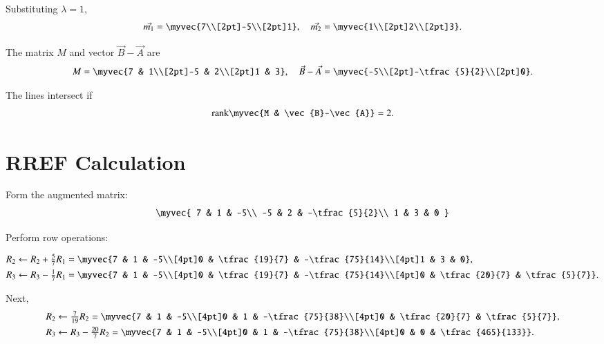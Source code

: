 \documentclass[journal]{IEEEtran}
\begin{document}
Substituting $\lambda=1$,
\begin{align}
\vec{m_1} = \myvec{7\\[2pt]-5\\[2pt]1}, \quad 
\vec{m_2} = \myvec{1\\[2pt]2\\[2pt]3}. \label{eq:m1m2}
\end{align}

The matrix $M$ and vector $\vec{B}-\vec{A}$ are
\begin{align}
M = \myvec{7 & 1\\[2pt]-5 & 2\\[2pt]1 & 3}, \quad 
\vec{B}-\vec{A} = \myvec{-5\\[2pt]-\tfrac{5}{2}\\[2pt]0}. \label{eq:M_BA}
\end{align}

\noindent The lines intersect if
\begin{align}
\text{rank}\myvec{M & \vec{B}-\vec{A}} = 2. \label{eq:intersect}
\end{align}

\section*{RREF Calculation}

Form the augmented matrix:
\begin{align}
\myvec{
7 & 1 & -5\\
-5 & 2 & -\tfrac{5}{2}\\
1 & 3 & 0
}
\end{align}

\noindent Perform row operations:

\begin{align}
R_2 &\leftarrow R_2 + \tfrac{5}{7}R_1 = 
\myvec{7 & 1 & -5\\[4pt]0 & \tfrac{19}{7} & -\tfrac{75}{14}\\[4pt]1 & 3 & 0}, \\
R_3 &\leftarrow R_3 - \tfrac{1}{7}R_1 = 
\myvec{7 & 1 & -5\\[4pt]0 & \tfrac{19}{7} & -\tfrac{75}{14}\\[4pt]0 & \tfrac{20}{7} & \tfrac{5}{7}}. 
\end{align}

Next,
\begin{align}
R_2 &\leftarrow \tfrac{7}{19}R_2 = 
\myvec{7 & 1 & -5\\[4pt]0 & 1 & -\tfrac{75}{38}\\[4pt]0 & \tfrac{20}{7} & \tfrac{5}{7}}, \\
R_3 &\leftarrow R_3 - \tfrac{20}{7}R_2 =
\myvec{7 & 1 & -5\\[4pt]0 & 1 & -\tfrac{75}{38}\\[4pt]0 & 0 & \tfrac{465}{133}}. 
\end{align}
\end{document}
